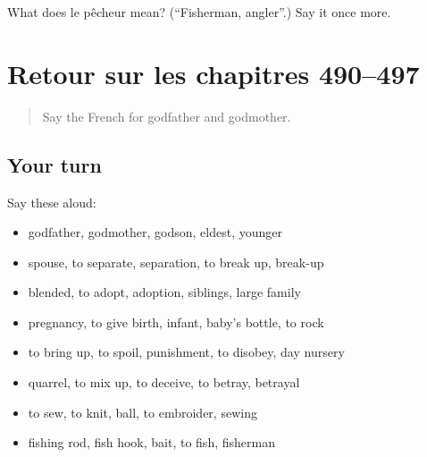 \begin{tcolorbox}[breakable,colback=teal!4,colframe=teal!35!black,title={Before you move on}]
What does le pêcheur mean? (\textquotedblleft{}Fisherman, angler\textquotedblright{}.) Say it once more.
\end{tcolorbox}
\section[(dialogue)]{Retour sur les chapitres 490–497}

\label{lesson:FR-R497-revision-490-497}



\begin{quote}
Say the French for godfather and godmother.
\end{quote}

\subsection*{Your turn}
Say these aloud:

\begin{itemize}
\raggedright
  \item godfather, godmother, godson, eldest, younger
  \item spouse, to separate, separation, to break up, break-up
  \item blended, to adopt, adoption, siblings, large family
  \item pregnancy, to give birth, infant, baby's bottle, to rock
  \item to bring up, to spoil, punishment, to disobey, day nursery
  \item quarrel, to mix up, to deceive, to betray, betrayal
  \item to sew, to knit, ball, to embroider, sewing
  \item fishing rod, fish hook, bait, to fish, fisherman
\end{itemize}


